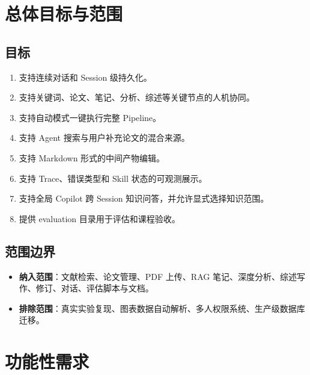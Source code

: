 \documentclass[12pt,a4paper,onecolumn]{ctexart}
\begin{document}
\section{总体目标与范围}

\subsection{目标}
\begin{enumerate}[label=\textbf{G\arabic*.}]
  \item 支持连续对话和 Session 级持久化。
  \item 支持关键词、论文、笔记、分析、综述等关键节点的人机协同。
  \item 支持自动模式一键执行完整 Pipeline。
  \item 支持 Agent 搜索与用户补充论文的混合来源。
  \item 支持 Markdown 形式的中间产物编辑。
  \item 支持 Trace、错误类型和 Skill 状态的可观测展示。
  \item 支持全局 Copilot 跨 Session 知识问答，并允许显式选择知识范围。
  \item 提供 evaluation 目录用于评估和课程验收。
\end{enumerate}

\subsection{范围边界}
\begin{itemize}
  \item \textbf{纳入范围}：文献检索、论文管理、PDF 上传、RAG 笔记、深度分析、综述写作、修订、对话、评估脚本与文档。
  \item \textbf{排除范围}：真实实验复现、图表数据自动解析、多人权限系统、生产级数据库迁移。
\end{itemize}

\section{功能性需求}
\end{document}

